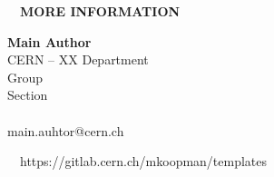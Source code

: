 \documentclass[
portrait,
a0paper%
]
{baposter}
\begin{document}
\begin{poster}
{\begin{minipage}[t][3.6cm]{.32\textwidth}
\begin{minipage}{.1\textwidth}
      \hspace{\textwidth}
	\end{minipage}
  \end{minipage}
  \hfill\vline\hfill
  \begin{minipage}[t][3.6cm]{.32\textwidth}
  \vspace{0.3cm}
  $\quad$\textbf{\small\color{cernblue}MORE INFORMATION} \vspace{0.15cm}\\ 
	\begin{minipage}{.35\textwidth}
	  \begin{center}
	  \end{center}
	\end{minipage}
	\begin{minipage}{.64\textwidth} 
    \vspace{.3cm}
	  \color{cernblue}
	  \footnotesize
	  \textbf{Main Author}\\
    CERN -- XX Department \\
    Group \\
    Section \\$\;$\\
	  main.auhtor@cern.ch\\
	\end{minipage}
	\vspace{0.25cm}
	\color{cernblue}
	\small
	$\quad$https://gitlab.cern.ch/mkoopman/templates
  \end{minipage}
}
%
%
%
\end{poster}
\end{document}
